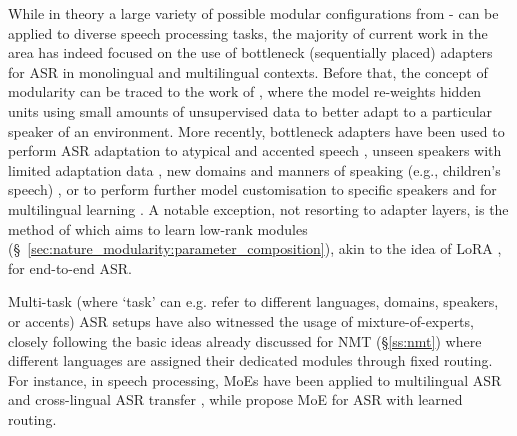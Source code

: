 

While in theory a large variety of possible modular configurations from - can be applied to diverse speech processing tasks, the majority of current work in the area has indeed focused on the use of bottleneck (sequentially placed) adapters for ASR in monolingual and multilingual contexts. Before that, the concept of modularity can be traced to the work of \citet{Swietojanski:2016taslp}, where the model re-weights hidden units using small amounts of unsupervised data to better adapt to a particular speaker of an environment. More recently, bottleneck adapters have been used to perform ASR adaptation to atypical and accented speech \citep{tomanek-etal-2021-residual}, unseen speakers with limited adaptation data \citep{Wang:2022speech,Eeckt:2022speech,Chen:2022speech}, new domains and manners of speaking (e.g., children's speech) \citep{Fan:2022speech,Zhu:2022speech}, or to perform further model customisation to specific speakers \citep{Biadsy:2022speech,Sathyendra:2022speech} and for multilingual learning \citep{Kannan:2019interspeech,Hou:2022speech}. A notable exception, not resorting to adapter layers, is the method of \citep{Winata:2020speech} which aims to learn low-rank modules (\S~\ref{sec:nature_modularity:parameter_composition}), akin to the idea of LoRA \citep{hu2021lora}, for end-to-end ASR.



Multi-task (where `task' can e.g. refer to different languages, domains, speakers, or accents) ASR setups have also witnessed the usage of mixture-of-experts, closely following the basic ideas already discussed for NMT (\S\ref{ss:nmt}) where different languages are assigned their dedicated modules through fixed routing. For instance, in speech processing, MoEs have been applied to multilingual ASR and cross-lingual ASR transfer \citep{Bai:2022speech,Gaur:2021speechmoe,Kumatani:2021arxiv}, while \cite{you2022speechmoe2} propose MoE for ASR with learned routing.

